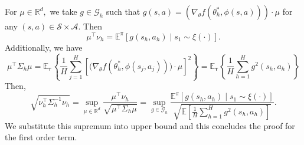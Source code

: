\documentclass{article}
\numberwithin{equation}{section}
\theoremstyle{plain}
\theoremstyle{definition}
\theoremstyle{remark}
\begin{document}
For $\mu \in \mathbb{R}^d,$ we take $g \in \mathcal{G}_h$ such that $g(s,a) = \left(\nabla_{\theta} f\left(\theta_{h}^*, \phi(s, a)\right)\right)\cdot \mu$ for any $(s,a) \in \mathcal{S} \times \mathcal{A}.$ Then
$$
\mu^{\top} \nu_h = \mathbb{E}^{\pi}\left[g(s_h,a_h) \mid s_1 \sim \xi(\cdot)\right].
$$
Additionally, we have
\begin{equation*}
    \mu^{\top} \Sigma_h \mu = \mathbb{E}_{\boldsymbol{\tau}} \left\{\frac{1}{H} \sum_{j=1}^H \left[\bigg(\nabla_{\theta} f\left(\theta_{h}^*, \phi(s_{j}, a_{j})\right)\bigg) \cdot \mu\right]^2 \right\} = \mathbb{E}_{\boldsymbol{\tau}} \left\{\frac{1}{H} \sum_{h=1}^H g^2\left(s_h,a_h\right) \right\}
\end{equation*}
Then,
$$
 \sqrt{\nu_h^{\top} \Sigma_h^{-1} \nu_h} = \sup_{\mu \in \mathbb{R}^d} \frac{\mu^{\top} \nu_h}{\sqrt{\mu^{\top} \Sigma_h \mu}} = \sup_{g \in \mathcal{G}_h} \frac{\mathbb{E}^{\pi}\left[g\left(s_{h}, a_{h}\right) \mid s_{1} \sim \xi(\cdot)\right]}{\sqrt{\mathbb{E}\left[\frac{1}{H} \sum_{h=1}^{H} g^{2}\left(s_{h}, a_{h}\right)\right]}}.
$$
We substitute this supremum into upper bound and this concludes the proof for the first order term.
\end{document}
